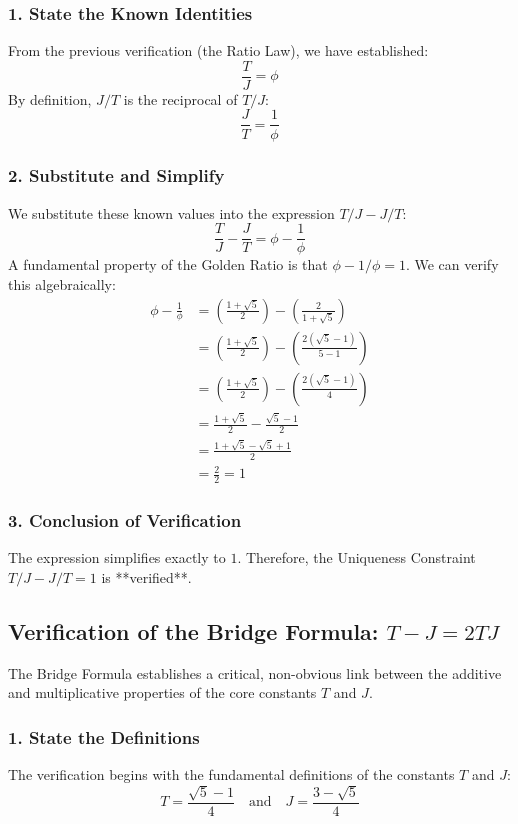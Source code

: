 \subsubsection*{1. State the Known Identities}
From the previous verification (the Ratio Law), we have established:
$$ \frac{T}{J} = \phi $$
By definition, $J/T$ is the reciprocal of $T/J$:
$$ \frac{J}{T} = \frac{1}{\phi} $$

\subsubsection*{2. Substitute and Simplify}
We substitute these known values into the expression $T/J - J/T$:
$$ \frac{T}{J} - \frac{J}{T} = \phi - \frac{1}{\phi} $$
A fundamental property of the Golden Ratio is that $\phi - 1/\phi = 1$. We can verify this algebraically:
\begin{align*}
\phi - \frac{1}{\phi} &= \left(\frac{1+\sqrt{5}}{2}\right) - \left(\frac{2}{1+\sqrt{5}}\right) \\
&= \left(\frac{1+\sqrt{5}}{2}\right) - \left(\frac{2(\sqrt{5}-1)}{5-1}\right) \\
&= \left(\frac{1+\sqrt{5}}{2}\right) - \left(\frac{2(\sqrt{5}-1)}{4}\right) \\
&= \frac{1+\sqrt{5}}{2} - \frac{\sqrt{5}-1}{2} \\
&= \frac{1+\sqrt{5}-\sqrt{5}+1}{2} \\
&= \frac{2}{2} = 1
\end{align*}

\subsubsection*{3. Conclusion of Verification}
The expression simplifies exactly to $1$. Therefore, the Uniqueness Constraint $T/J - J/T = 1$ is **verified**.

\newpage
\subsection{Verification of the Bridge Formula: \texorpdfstring{\(T - J = 2TJ\)}{T - J = 2TJ}}

The Bridge Formula establishes a critical, non-obvious link between the additive and multiplicative properties of the core constants $T$ and $J$.

\subsubsection*{1. State the Definitions}
The verification begins with the fundamental definitions of the constants $T$ and $J$:
$$ T = \frac{\sqrt{5}-1}{4} \quad \text{and} \quad J = \frac{3-\sqrt{5}}{4} $$

